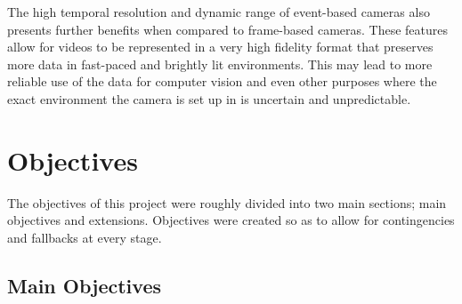 The high temporal resolution and dynamic range of event-based cameras also presents further benefits when compared to frame-based cameras. These features allow for videos to be represented in a very high fidelity format that preserves more data in fast-paced and brightly lit environments. This may lead to more reliable use of the data for computer vision and even other purposes where the exact environment the camera is set up in is uncertain and unpredictable.

\section{Objectives}

The objectives of this project were roughly divided into two main sections; main objectives and extensions. Objectives were created so as to allow for contingencies and fallbacks at every stage.

\subsection{Main Objectives}


